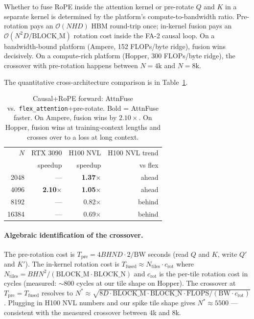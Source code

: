 \documentclass[10pt,twocolumn]{article}
\begin{document}
\begin{tcolorbox}[colback=blue!4, colframe=blue!50!black, arc=2pt,
                  title={\bfseries The Rotation Calculus}]
Whether to fuse RoPE inside the attention kernel or pre-rotate $Q$
and $K$ in a separate kernel is determined by the platform's
compute-to-bandwidth ratio. Pre-rotation pays an $\mathcal{O}(NHD)$
HBM round-trip once; in-kernel fusion pays an $\mathcal{O}(N^2 D /
\text{BLOCK\_M})$ rotation cost inside the FA-2 causal loop. On a
bandwidth-bound platform (Ampere, 152 FLOPs/byte ridge), fusion
wins decisively. On a compute-rich platform (Hopper, 300 FLOPs/byte
ridge), the crossover with pre-rotation happens between
$N{=}4\text{k}$ and $N{=}8\text{k}$.
\end{tcolorbox}

The quantitative cross-architecture comparison is in
Table~\ref{tab:rotation_calculus}.

\begin{table}[H]
\centering\small
\begin{tabular}{rrrr}
\toprule
$N$ & RTX 3090 & H100 NVL & H100 NVL trend \\
    & speedup  & speedup  & vs flex \\
\midrule
2048  & ---            & \textbf{1.37$\times$} & ahead \\
4096  & \textbf{2.10$\times$} & \textbf{1.05$\times$} & ahead \\
8192  & ---            & 0.82$\times$   & behind \\
16384 & ---            & 0.69$\times$   & behind \\
\bottomrule
\end{tabular}
\caption{Causal+RoPE forward: AttnFuse vs.\
\texttt{flex\_attention}+pre-rotate. Bold = AttnFuse faster. On
Ampere, fusion wins by $2.10\times$. On Hopper, fusion wins at
training-context lengths and crosses over to a loss at long context.}
\label{tab:rotation_calculus}
\end{table}

\paragraph{Algebraic identification of the crossover.}
The pre-rotation cost is $T_\text{pre} = 4BHND \cdot 2/\text{BW}$
seconds (read $Q$ and $K$, write $Q'$ and $K'$). The in-kernel
rotation cost is $T_\text{fused} \approx
N_\text{tiles} \cdot c_\text{rot}$ where
$N_\text{tiles} = B H N^2 / (\text{BLOCK\_M} \cdot \text{BLOCK\_N})$
and $c_\text{rot}$ is the per-tile rotation cost in cycles
(measured: $\sim 800$ cycles at our tile shape on Hopper). The
crossover at $T_\text{pre} = T_\text{fused}$ resolves to
$N^* \approx \sqrt{8 D \cdot \text{BLOCK\_M} \cdot \text{BLOCK\_N}
\cdot \text{FLOPS} / (\text{BW} \cdot c_\text{rot})}$. Plugging in
H100 NVL numbers and our spike tile shape gives
$N^* \approx 5500$ --- consistent with the measured crossover
between 4k and 8k.
\end{document}
